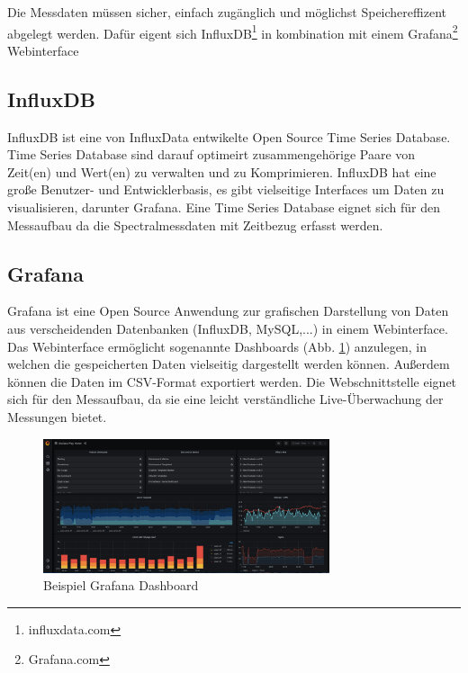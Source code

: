 Die Messdaten müssen sicher, einfach zugänglich und möglichst Speichereffizent abgelegt werden.
Dafür eigent sich InfluxDB\footnote{influxdata.com} in kombination mit einem Grafana\footnote{Grafana.com} Webinterface
\subsection{InfluxDB}\label{datenbankundinterface}
InfluxDB ist eine von InfluxData entwikelte Open Source Time Series Database. 
Time Series Database  sind darauf optimeirt zusammengehörige Paare von Zeit(en) und Wert(en) zu verwalten und zu Komprimieren.
InfluxDB hat eine große Benutzer- und Entwicklerbasis, es gibt vielseitige Interfaces um Daten zu visualisieren, darunter Grafana.
Eine Time Series Database eignet sich für den Messaufbau da die Spectralmessdaten mit Zeitbezug erfasst werden.

\subsection{Grafana}
Grafana ist eine Open Source Anwendung zur grafischen Darstellung von Daten aus verscheidenden Datenbanken (InfluxDB,  MySQL,...) in einem Webinterface.
Das Webinterface ermöglicht sogenannte Dashboards (Abb. \ref{fig:Beispiel_Grafana_Dashboard}) anzulegen, in welchen die gespeicherten Daten vielseitig dargestellt werden können.
Außerdem können die Daten im CSV-Format exportiert werden.
Die Webschnittstelle eignet sich für den Messaufbau, da sie eine leicht verständliche Live-Überwachung der Messungen bietet.
\begin{figure}[ht!]
\centering
\includegraphics[width=0.75\textwidth]{img/Beispiel_Grafana_Dashboard}
\caption{Beispiel Grafana Dashboard}
\label{fig:Beispiel_Grafana_Dashboard}
\end{figure}